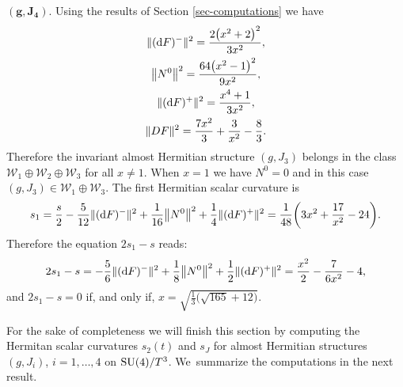 \documentclass[10pt,a4paper]{amsart}
\numberwithin{equation}{section}
\begin{document}
\medskip\noindent
$\boldsymbol{(g,J_{4}).}$ Using the results of Section \ref{sec-computations} we have
\begin{gather*}
\|({\rm d}F)^{-}\|^{2}=\frac{2 \big(x^2+2\big)^2}{3 x^2},\\
\big\|N^{0}\big\|^{2}=\frac{64 \big(x^2-1\big)^2}{9 x^2}, \\
\|({\rm d}F)^{+}\|^{2}=\frac{x^4+1}{3 x^2}, \\
\|DF\|^{2}=\frac{7 x^2}{3}+\frac{3}{x^2}-\frac{8}{3}.
\end{gather*}
Therefore the invariant almost Hermitian structure $(g,J_3)$ belongs in the class $\mathcal{W}_{1}\oplus \mathcal{W}_{2}\oplus \mathcal{W}_{3}$ for all $x\neq 1$. When $x=1$ we have $N^0=0$ and in this case $(g,J_3)\in \mathcal{W}_{1}\oplus \mathcal{W}_{3} $.
The first Hermitian scalar curvature is
\begin{align*}
s_{1}=\dfrac{s}{2}-\dfrac{5}{12}\|({\rm d}F)^{-}\|^{2}+\dfrac{1}{16}\big\|N^{0}\big\|^{2}+\dfrac{1}{4}\|({\rm d}F)^{+}\|^{2}
=\frac{1}{48} \bigg(3 x^2+\frac{17}{x^2}-24\bigg).
\end{align*}
Therefore the equation $2s_{1}-s$ reads:
\begin{align*}
2s_{1}-s=-\dfrac{5}{6}\|({\rm d}F)^{-}\|^{2}+\dfrac{1}{8}\big\|N^{0}\big\|^{2}+\dfrac{1}{2}\|({\rm d}F)^{+}\|^{2}
=\frac{x^2}{2}-\frac{7}{6 x^2}-4,
\end{align*}
and $2s_{1}-s=0$ if, and only if, $x=\sqrt{\frac{1}{3} \big(\sqrt{165}+12\big)}$.

For the sake of completeness we will finish this section by computing the Hermitan scalar curvatures $s_2(t)$ and $s_J$ for almost Hermitian structures $(g, J_i)$, $i=1,\ldots,4$ on ${\rm SU}(4)/T^3$. We~summarize the computations in the next result.
\end{document}
